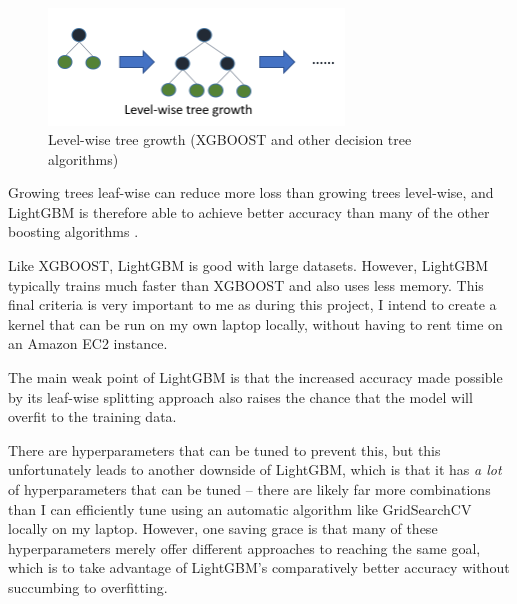 \documentclass[12pt, letterpaper]{article}
\begin{document}
\begin{enumerate}
  \begin{figure}[ht]
  \includegraphics[width=0.7\textwidth]{level-wise}
  \centering
  \caption{Level-wise tree growth (XGBOOST and other decision tree algorithms)\cite{lightgbmdocs}}
  \end{figure}

  Growing trees leaf-wise can reduce more loss than growing trees level-wise, and LightGBM is therefore able to achieve better accuracy than many of the other boosting algorithms \cite{vidhyalightgbm}.

  Like XGBOOST, LightGBM is good with large datasets. However, LightGBM typically trains much faster than XGBOOST and also uses less memory. This final criteria is very important to me as during this project, I intend to create a kernel that can be run on my own laptop locally, without having to rent time on an Amazon EC2 instance.

  The main weak point of LightGBM is that the increased accuracy made possible by its leaf-wise splitting approach also raises the chance that the model will overfit to the training data.

  There are hyperparameters that can be tuned to prevent this, but this unfortunately leads to another downside of LightGBM, which is that it has \textit{a lot} of hyperparameters that can be tuned -- there are likely far more combinations than I can efficiently tune using an automatic algorithm like GridSearchCV locally on my laptop. However, one saving grace is that many of these hyperparameters merely offer different approaches to reaching the same goal, which is to take advantage of LightGBM's comparatively better accuracy without succumbing to overfitting.
\end{enumerate}
\end{document}
